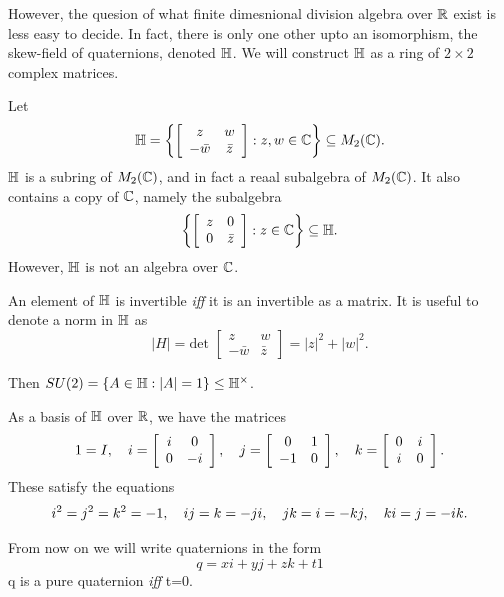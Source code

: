 However, the quesion of what finite dimesnional division algebra over \(\mathbb{R}\) exist is
less easy to decide. In fact, there is only one other upto an isomorphism, the skew-field
of quaternions, denoted \(\mathbb{H}\). We will construct \(\mathbb{H}\) as a ring of \(2\times 2\) complex
matrices.

Let
\[ \mathbb{H}=\left\{ \left[\begin{array}{cc} z & w \\ -\bar{w} & \bar{z}\end{array}\right]:z,w\in\mathbb{C} \right\} \subseteq M_2(\mathbb{C}). \]
\(\mathbb{H}\) is a subring of \(M_2(\mathbb{C})\), and in fact a reaal subalgebra of \(M_2(\mathbb{C})\).
It also contains a copy of \(\mathbb{C}\), namely the subalgebra
\[ \left\{\left[\begin{array}{cc} z & 0 \\ 0 & \bar{z} \end{array}\right]:z\in\mathbb{C}\right\}\subseteq\mathbb{H}. \]
However, \(\mathbb{H}\) is not an algebra over \(\mathbb{C}\).

An element of \(\mathbb{H}\) is invertible {\it iff} it is an invertible as a matrix. It is useful
to denote a norm in \(\mathbb{H}\) as
\[ |H|=\text{det }\left[\begin{array}{cc} z & w \\ -\bar{w} & \bar{z} \end{array}\right] = |z|^2+|w|^2. \]

Then \( SU(2)=\{A\in\mathbb{H}:|A|=1\}\le\mathbb{H}^{\times}\).

As a basis of \(\mathbb{H}\) over \(\mathbb{R}\), we have the matrices
\[
  1=I,\hspace{10px}
  i=\left[\begin{array}{cc} i & 0 \\ 0 & -i \end{array}\right],\hspace{10px}
  j=\left[\begin{array}{cc} 0 & 1 \\ -1 & 0 \end{array}\right],\hspace{10px}
  k=\left[\begin{array}{cc} 0 & i \\ i & 0 \end{array}\right].
\]
These satisfy the equations
\[ i^2=j^2=k^2=-1,\hspace{10px} ij=k=-ji,\hspace{10px} jk=i=-kj,\hspace{10px} ki=j=-ik. \]

From now on we will write quaternions in the form
\[ q = xi + yj + zk +t1 \]
q is a pure quaternion {\it iff} t=0.

